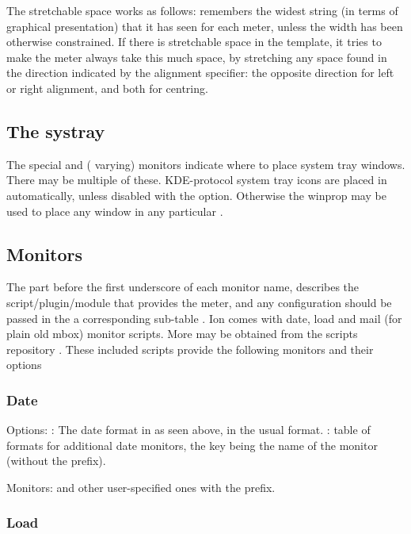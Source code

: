 The stretchable space works as follows:  remembers
the widest string (in terms of graphical presentation) that it has
seen for each meter, unless the width has been otherwise constrained.
If there is stretchable space in the template, it tries to make the
meter always take this much space, by stretching any space found in
the direction indicated by the alignment specifier: the opposite
direction for left or right alignment, and both for centring.

\subsection{The systray}

The special  and 
(\codestr{*} varying) monitors indicate where to place system tray 
windows.  There may be multiple of these. KDE-protocol system tray
icons are placed in  automatically, unless disabled 
with the  option. Otherwise the  winprop may
be used to place any window in any particular .

\subsection{Monitors}

The part before the first
underscore of each monitor name, describes the script/plugin/module
that provides the meter, and any configuration should be passed
in the a corresponding sub-table .
Ion comes with date, load and mail (for plain old mbox) 
 monitor scripts. More may be obtained from 
the scripts repository \cite{scripts}. These included scripts 
provide the following monitors and their options

\subsubsection{Date}

Options: : The date format in as seen above, 
in the usual  format. : table of
formats for additional date monitors, the key being the name
of the monitor (without the  prefix).

Monitors:  and other user-specified ones with the
 prefix.


\subsubsection{Load}

